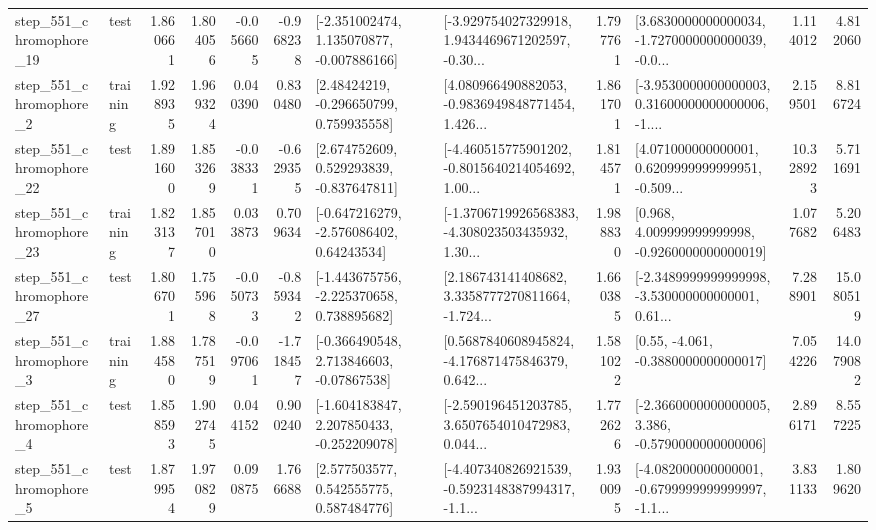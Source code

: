 \begin{tabular}{llrrrrllrlrr}
  step\_551\_chromophore\_19 &      test &      1.860661 &    1.804056 &     -0.056605 & -0.968238 &   [-2.351002474, 1.135070877, -0.007886166] &  [-3.929754027329918, 1.9434469671202597, -0.30... &       1.797761 &  [3.6830000000000034, -1.7270000000000039, -0.0... &            1.114012 &          4.812060 \\
   step\_551\_chromophore\_2 &  training &      1.928935 &    1.969324 &      0.040390 &  0.830480 &     [2.48424219, -0.296650799, 0.759935558] &  [4.080966490882053, -0.9836949848771454, 1.426... &       1.861701 &  [-3.9530000000000003, 0.31600000000000006, -1.... &            2.159501 &          8.816724 \\
  step\_551\_chromophore\_22 &      test &      1.891600 &    1.853269 &     -0.038331 & -0.629355 &    [2.674752609, 0.529293839, -0.837647811] &  [-4.460515775901202, -0.8015640214054692, 1.00... &       1.814571 &  [4.071000000000001, 0.6209999999999951, -0.509... &           10.328923 &          5.711691 \\
  step\_551\_chromophore\_23 &  training &      1.823137 &    1.857010 &      0.033873 &  0.709634 &    [-0.647216279, -2.576086402, 0.64243534] &  [-1.3706719926568383, -4.308023503435932, 1.30... &       1.988830 &    [0.968, 4.009999999999998, -0.9260000000000019] &            1.077682 &          5.206483 \\
  step\_551\_chromophore\_27 &      test &      1.806701 &    1.755968 &     -0.050733 & -0.859342 &   [-1.443675756, -2.225370658, 0.738895682] &  [2.186743141408682, 3.3358777270811664, -1.724... &       1.660385 &  [-2.3489999999999998, -3.530000000000001, 0.61... &            7.288901 &         15.080519 \\
   step\_551\_chromophore\_3 &  training &      1.884580 &    1.787519 &     -0.097061 & -1.718457 &    [-0.366490548, 2.713846603, -0.07867538] &  [0.5687840608945824, -4.176871475846379, 0.642... &       1.581022 &                [0.55, -4.061, -0.3880000000000017] &            7.054226 &         14.079082 \\
   step\_551\_chromophore\_4 &      test &      1.858593 &    1.902745 &      0.044152 &  0.900240 &   [-1.604183847, 2.207850433, -0.252209078] &  [-2.590196451203785, 3.6507654010472983, 0.044... &       1.772626 &  [-2.3660000000000005, 3.386, -0.5790000000000006] &            2.896171 &          8.557225 \\
   step\_551\_chromophore\_5 &      test &      1.879954 &    1.970829 &      0.090875 &  1.766688 &     [2.577503577, 0.542555775, 0.587484776] &  [-4.407340826921539, -0.5923148387994317, -1.1... &       1.930095 &  [-4.082000000000001, -0.6799999999999997, -1.1... &            3.831133 &          1.809620 \\

\end{tabular}
